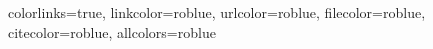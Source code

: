 \usepackage{booktabs}
\usepackage{mdframed}
\usepackage{xcolor}
\usepackage{hyperref}
\hypersetup
    {colorlinks=true,
    linkcolor=roblue,
urlcolor=roblue,
filecolor=roblue,
citecolor=roblue,
allcolors=roblue
    }
\newenvironment{summaryblock}
    {\begin{mdframed}[linecolor=roblue,linewidth=2pt]}
    {\end{mdframed}}

